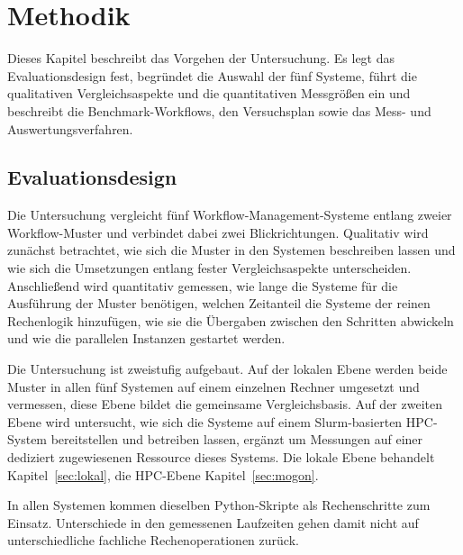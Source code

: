 
\lstset{breaklines=true, breakatwhitespace=false}

\chapter{Methodik}
\label{sec:methodik}

Dieses Kapitel beschreibt das Vorgehen der Untersuchung. Es legt das
Evaluationsdesign fest, begründet die Auswahl der fünf Systeme,
führt die qualitativen Vergleichsaspekte und die quantitativen
Messgrößen ein und beschreibt die Benchmark-Workflows, den
Versuchsplan sowie das Mess- und Auswertungsverfahren.

\section{Evaluationsdesign}
\label{sec:methodik:design}

Die Untersuchung vergleicht fünf Workflow-Management-Systeme entlang
zweier Workflow-Muster und verbindet dabei zwei Blickrichtungen.
Qualitativ wird zunächst betrachtet, wie sich die Muster in den
Systemen beschreiben lassen und wie sich die Umsetzungen entlang
fester Vergleichsaspekte unterscheiden. Anschließend wird
quantitativ gemessen, wie lange die Systeme für die Ausführung der
Muster benötigen, welchen Zeitanteil die Systeme der reinen
Rechenlogik hinzufügen, wie sie die Übergaben zwischen den Schritten
abwickeln und wie die parallelen Instanzen gestartet werden.

Die Untersuchung ist zweistufig aufgebaut. Auf der lokalen Ebene
werden beide Muster in allen fünf Systemen auf einem einzelnen
Rechner umgesetzt und vermessen, diese Ebene bildet die gemeinsame
Vergleichsbasis. Auf der zweiten Ebene wird untersucht, wie sich die
Systeme auf einem Slurm-basierten HPC-System bereitstellen und
betreiben lassen, ergänzt um Messungen auf einer dediziert
zugewiesenen Ressource dieses Systems. Die lokale Ebene behandelt
Kapitel~\ref{sec:lokal}, die HPC-Ebene Kapitel~\ref{sec:mogon}.

In allen Systemen kommen dieselben Python-Skripte als Rechenschritte
zum Einsatz. Unterschiede in den gemessenen Laufzeiten gehen damit
nicht auf unterschiedliche fachliche Rechenoperationen zurück.

